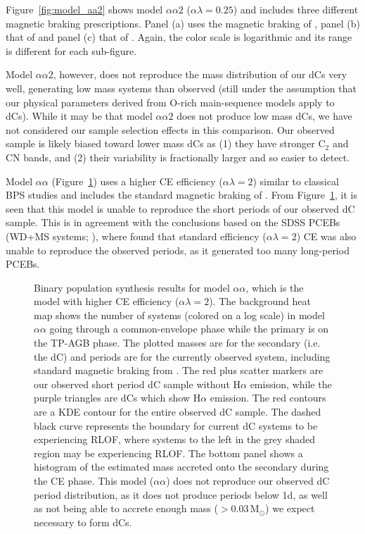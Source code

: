 \documentclass[twocolumn]{aastex631}
\begin{document}
Figure~\ref{fig:model_aa2} shows model $\alpha\alpha2$ ($\alpha\lambda=0.25$) and includes three different magnetic braking prescriptions. Panel (a) uses the magnetic braking of \citet{Rappaport1983}, panel (b) that of \citet{Ivanova2003} and panel (c) that of  \citet{Knigge2011}. Again, the color scale is logarithmic and its range is different for each sub-figure. 

Model $\alpha\alpha2$, however, does not reproduce the mass distribution of our dCs very well, generating low mass systems than observed (still under the assumption that our physical parameters derived from O-rich main-sequence models apply to dCs). While it may be that model $\alpha\alpha2$ does not produce low mass dCs, we have not considered our sample selection effects in this comparison. Our observed sample is likely biased toward lower mass dCs as (1) they have stronger C$_2$ and CN bands, and (2) their variability is fractionally larger and so easier to detect.

Model $\alpha\alpha$ (Figure~\ref{fig:model_aa}) uses a higher CE efficiency ($\alpha\lambda=2$) similar to classical BPS studies and includes the standard magnetic braking of \citet{Rappaport1983}. From Figure~\ref{fig:model_aa}, it is seen that this model is unable to reproduce the short  periods of our observed dC sample. This is in agreement with the conclusions based on the SDSS PCEBs (WD+MS systems; \citealt{Zorotovic2010,Toonen2013,Camacho2014}), where \citet{Toonen2013} found that standard efficiency  ($\alpha\lambda=2$) CE was also unable to reproduce the observed periods, as it generated too many long-period PCEBs.




\begin{figure}
\centering
{}
\caption{Binary population synthesis results for model $\alpha\alpha$, which is the model with higher CE efficiency ($\alpha\lambda=2$). The background heat map shows the number of systems (colored on a log scale) in model $\alpha\alpha$ going through a common-envelope phase while the primary is on the TP-AGB phase. The plotted masses are for the secondary (i.e. the dC) and periods are for the currently observed system, including standard magnetic braking from \citet{Rappaport1983}. The red plus scatter markers are our observed short period dC sample without H$\alpha$ emission, while the purple triangles are dCs which show H$\alpha$ emission. The red contours are a KDE contour for the entire observed dC sample. The dashed black curve represents the boundary for current dC systems to be experiencing RLOF, where systems to the left in the grey shaded region may be experiencing RLOF. The bottom panel shows a histogram of the estimated mass accreted onto the secondary during the CE phase. This model ($\alpha\alpha$) does not reproduce our observed dC period distribution, as it does not produce periods below 1d, as well as not being able to accrete enough mass ($>$0.03\,M$_\odot$) we expect necessary to form dCs.}
\label{fig:model_aa}
\end{figure}
\end{document}
